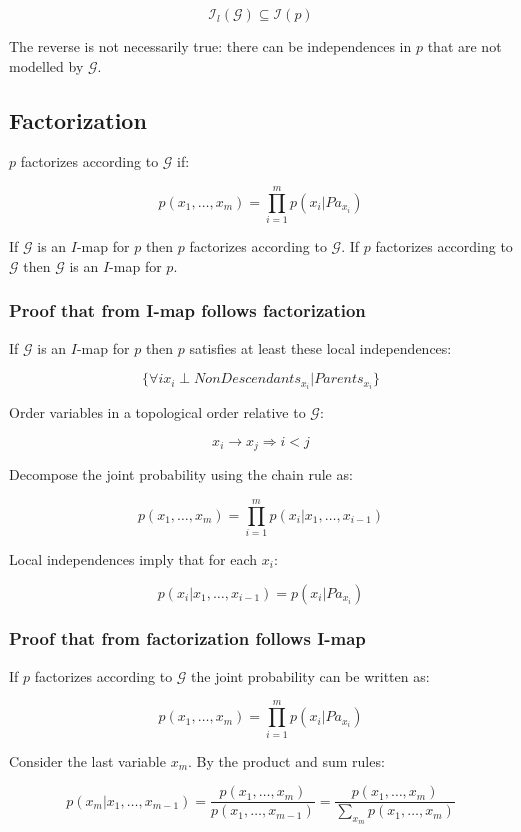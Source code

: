 	$$\mathcal{I}_l(\mathcal{G})\subseteq\mathcal{I}(p)$$

	The reverse is not necessarily true: there can be independences in $p$ that are not modelled by $\mathcal{G}$.

	\subsection{Factorization}
	$p$ factorizes according to $\mathcal{G}$ if:

	$$p(x_1, \dots, x_m) = \prod\limits_{i=1}^m p(x_i|Pa_{x_i})$$

	If $\mathcal{G}$ is an $I$-map for $p$ then $p$ factorizes according to $\mathcal{G}$.
	If $p$ factorizes according to $\mathcal{G}$ then $\mathcal{G}$ is an $I$-map for $p$.

		\subsubsection{Proof that from I-map follows factorization}
		If $\mathcal{G}$ is an $I$-map for $p$ then $p$ satisfies at least these local independences:

		$$\{\forall i x_i \perp NonDescendants_{x_i} | Parents_{x_i}\}$$

		Order variables in a topological order relative to $\mathcal{G}$:

		$$x_i\rightarrow x_j\Rightarrow i<j$$

		Decompose the joint probability using the chain rule as:

		$$p(x_1, \dots, x_m) = \prod\limits_{i = 1}^m p(x_i|x_1, \dots, x_{i-1})$$

		Local independences imply that for each $x_i$:

		$$p(x_i|x_1, \dots, x_{i-1}) = p(x_i | Pa_{x_i})$$

		\subsubsection{Proof that from factorization follows I-map}
		If $p$ factorizes according to $\mathcal{G}$ the joint probability can be written as:

		$$p(x_1, \dots, x_m) = \prod\limits_{i = 1}^m p(x_i|Pa_{x_i})$$

		Consider the last variable $x_m$.
		By the product and sum rules:

		$$p(x_m | x_1, \dots, x_{m-1}) = \frac{p(x_1, \dots, x_m)}{p(x_1, \dots, x_{m-1})} = \frac{p(x_1, \dots, x_m)}{\sum\limits_{x_m}p(x_1, \dots, x_m)}$$

